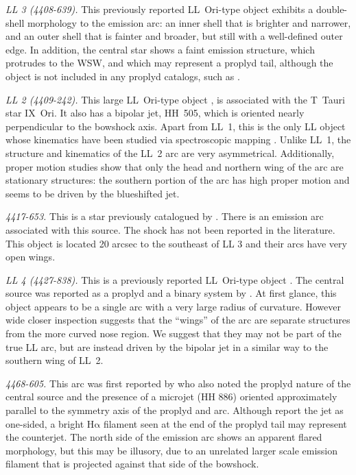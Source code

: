 \documentclass[apj, twocolumn]{aastex63}
\newcommand\ha{\ensuremath{\mathrm{H\alpha}}}
\begin{document}
\textit{LL 3 (4408-639).} This previously reported LL~Ori-type object
\citep{Bally:2001a} exhibits a double-shell morphology to the emission
arc: an inner shell that is brighter and narrower, and an outer shell
that is fainter and broader, but still with a well-defined outer edge.
In addition, the central star shows a faint emission structure, which
protrudes to the WSW, and which may represent a proplyd tail, although
the object is not included in any proplyd catalogs, such as
\citet{Ricci:2008a}.

\textit{LL 2 (4409-242).} This large LL~Ori-type object
\citep{Bally:2001a}, is associated with the T~Tauri star IX~Ori. It
also has a bipolar jet, HH~505, which is oriented nearly perpendicular
to the bowshock axis. Apart from LL~1, this is the only LL object
whose kinematics have been studied via spectroscopic mapping
\citep{Henney:2013a}. Unlike LL~1, the structure and kinematics of the
LL~2 arc are very asymmetrical.  Additionally, proper motion studies
\citep{Henney:2013a} show that only the head and northern wing of the
arc are stationary structures: the southern portion of the arc has
high proper motion and seems to be driven by the blueshifted jet.

\textit{4417-653.} This is a star previously catalogued by \citet{Hillenbrand:1997}.
There is an emission arc associated with this source. The shock has not been
reported in the literature. This object is located 20 arcsec to the southeast
of LL 3 and their arcs have very open wings.  

\textit{LL 4 (4427-838).} This is a previously reported LL~Ori-type
object \citep{Bally:2001a}. The central source was reported as a
proplyd and a binary system by \citet{Bally:2006a}. At first glance,
this object appears to be a single arc with a very large radius of
curvature. However wide closer inspection suggests that the ``wings''
of the arc are separate structures from the more curved nose
region. We suggest that they may not be part of the true LL arc, but
are instead driven by the bipolar jet \citep{Bally:2006a} in a similar
way to the southern wing of LL~2.

\textit{4468-605.}  This arc was first reported by \citet{Bally:2006a}
who also noted the proplyd nature of the central source and the
presence of a microjet (HH 886) oriented approximately parallel to the
symmetry axis of the proplyd and arc.  Although \citet{Bally:2006a}
report the jet as one-sided, a bright \ha{} filament seen at the end
of the proplyd tail may represent the counterjet.  The north side of
the emission arc shows an apparent flared morphology, but this may be
illusory, due to an unrelated larger scale emission filament that is
projected against that side of the bowshock.
\end{document}
